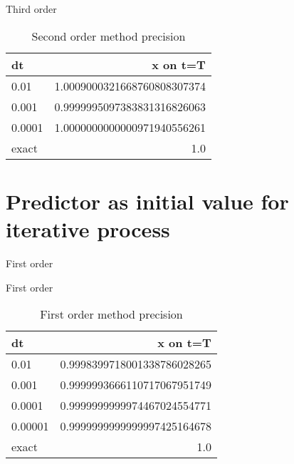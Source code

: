 \documentclass[10pt]{beamer}
\begin{document}
\begin{frame}{Third order}
  \begin{table}
    \caption{Second order method precision}
    \begin{tabular}{lr}
      \toprule
      dt & x on t=T\\
      \midrule
      0.01 & 1.0009000321668760808307374\\
      0.001 & 0.9999995097383831316826063\\
      0.0001 & 1.0000000000000971940556261\\
      \midrule
      exact & 1.0 \\
      \bottomrule
    \end{tabular}
  \end{table}
\end{frame}

\section{Predictor as initial value for iterative process}

\begin{frame}{First order}
  \begin{figure}
  \end{figure}
\end{frame}

\begin{frame}{First order}
  \begin{table}
    \caption{First order method precision}
    \begin{tabular}{lr}
      \toprule
      dt & x on t=T\\
      \midrule
      0.01 & 0.9998399718001338786028265\\
      0.001 & 0.9999993666110717067951749\\
      0.0001 & 0.9999999999974467024554771\\
      0.00001 & 0.9999999999999997425164678\\
      \midrule
      exact & 1.0 \\
      \bottomrule
    \end{tabular}
  \end{table}
\end{frame}
\end{document}

